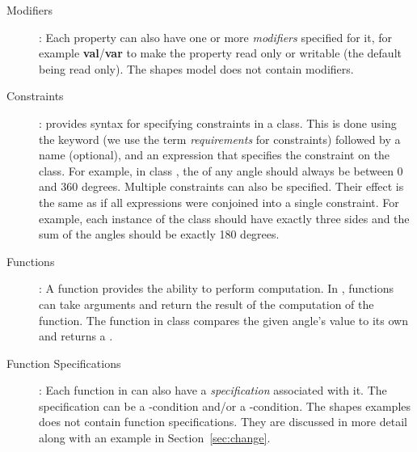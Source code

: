 \begin{description}
\item [Modifiers]: Each property can also have one or more
  {\em modifiers} specified for it, for example
  {\bf val}/{\bf var} to make the property read only or writable (the default being
    read only). The shapes model does not contain modifiers.
  
\item [Constraints]: \Klang{} provides syntax for specifying
  constraints in a class. This is done using the  keyword
  (we use the term {\em requirements} for constraints)
  followed by a name (optional), and an expression that specifies the
  constraint on the class. 
  For example, in class , the
   of any angle should always be between 0 and 360
  degrees. Multiple constraints can also be specified. Their effect is
  the same as if all expressions were conjoined into a single
  constraint. For example, each instance of the  class
  should have exactly three sides and the sum of the angles should be
  exactly 180 degrees.
  
\item [Functions]: A function provides the ability to perform
  computation. In \Klang{}, functions can take arguments and return
  the result of the computation of the function. The 
  function in class  compares the given angle's value to
  its own and returns a .

\item [Function Specifications]: Each function in \Klang{} can also
  have a \emph{specification} associated with it. The specification
  can be a -condition and/or a
  -condition. The shapes examples does not contain function
  specifications. They are discussed in more detail along with
  an example in Section~\ref{sec:change}.
  

\end{description}
